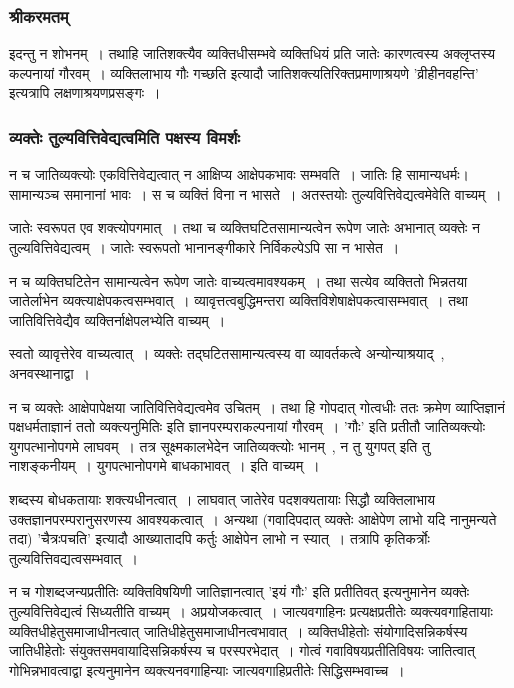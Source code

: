 			\subsubsection{श्रीकरमतम्}

				इदन्तु न शोभनम्~। तथाहि जातिशक्त्यैव व्यक्तिधीसम्भवे व्यक्तिधियं प्रति जातेः कारणत्वस्य अक्लृप्तस्य कल्पनायां गौरवम्~। व्यक्तिलाभाय गौः गच्छति इत्यादौ जातिशक्त्यतिरिक्तप्रमाणाश्रयणे 'व्रीहीनवहन्ति' इत्यत्रापि लक्षणाश्रयणप्रसङ्गः~।

			\subsubsection{व्यक्तेः तुल्यवित्तिवेद्यत्वमिति पक्षस्य विमर्शः} 

				न च जातिव्यक्त्योः एकवित्तिवेद्यत्वात् न आक्षिप्य आक्षेपकभावः सम्भवति~। जातिः हि सामान्यधर्मः। सामान्यञ्च समानानां भावः~। स च व्यक्तिं विना न भासते~। अतस्तयोः तुल्यवित्तिवेद्यत्वमेवेति वाच्यम्~।

				जातेः स्वरूपत एव शक्त्योपगमात्~। तथा च व्यक्तिघटितसामान्यत्वेन रूपेण जातेः अभानात् व्यक्तेः न तुल्यवित्तिवेद्यत्वम्~। जातेः स्वरूपतो भानानङ्गीकारे निर्विकल्पेऽपि सा न भासेत~। 

				न च व्यक्तिघटितेन सामान्यत्वेन रूपेण जातेः वाच्यत्वमावश्यकम्~। तथा सत्येव व्यक्तितो भिन्नतया जातेर्लाभेन व्यक्त्याक्षेपकत्वसम्भवात्~। व्यावृत्तत्वबुद्धिमन्तरा व्यक्तिविशेषाक्षेपकत्वासम्भवात्~। तथा जातिवित्तिवेद्यैव व्यक्तिर्नाक्षेपलभ्येति वाच्यम्~। 

				स्वतो व्यावृत्तेरेव वाच्यत्वात्~। व्यक्तेः तद्घटितसामान्यत्वस्य वा व्यावर्तकत्वे अन्योन्याश्रयाद्~, अनवस्थानाद्वा~।

				न च व्यक्तेः आक्षेपापेक्षया जातिवित्तिवेद्यत्वमेव उचितम्~। तथा हि गोपदात् गोत्वधीः ततः क्रमेण व्याप्तिज्ञानं पक्षधर्मताज्ञानं ततो व्यक्त्यनुमितिः इति ज्ञानपरम्पराकल्पनायां गौरवम्~। 'गौः' इति प्रतीतौ जातिव्यक्त्योः युगपत्भानोपगमे लाघवम्~। तत्र सूक्ष्मकालभेदेन जातिव्यक्त्योः भानम्~, न तु युगपत् इति तु नाशङ्कनीयम्~। युगपत्भानोपगमे बाधकाभावत्~। इति वाच्यम्~।

				शब्दस्य बोधकतायाः शक्त्यधीनत्वात्~। लाघवात् जातेरेव पदशक्यतायाः सिद्धौ व्यक्तिलाभाय उक्तज्ञानपरम्परानुसरणस्य आवश्यकत्वात्~। अन्यथा (गवादिपदात् व्यक्तेः आक्षेपेण लाभो यदि नानुमन्यते तदा) 'चैत्रःपचति' इत्यादौ आख्यातादपि कर्तुः आक्षेपेन लाभो न स्यात्~। तत्रापि कृतिकर्त्रोः तुल्यवित्तिवद्यत्वसम्भवात्~। 

				न च गोशब्दजन्यप्रतीतिः व्यक्तिविषयिणी जातिज्ञानत्वात् 'इयं गौः' इति प्रतीतिवत् इत्यनुमानेन व्यक्तेः तुल्यवित्तिवेद्यत्वं सिध्यतीति वाच्यम्~। अप्रयोजकत्वात्~। जात्यवगाहिनः प्रत्यक्षप्रतीतेः व्यक्त्यवगाहितायाः व्यक्तिधीहेतुसमाजाधीनत्वात् जातिधीहेतुसमाजाधीनत्वभावात्~। व्यक्तिधीहेतोः संयोगादिसन्निकर्षस्य जातिधीहेतोः संयुक्तसमवायादिसन्निकर्षस्य च परस्परभेदात्~। गोत्वं गवाविषयप्रतीतिविषयः जातित्वात् गोभिन्नभावत्वाद्वा इत्यनुमानेन व्यक्त्यनवगाहिन्याः जात्यवगाहिप्रतीतेः सिद्धिसम्भवाच्च~। 

